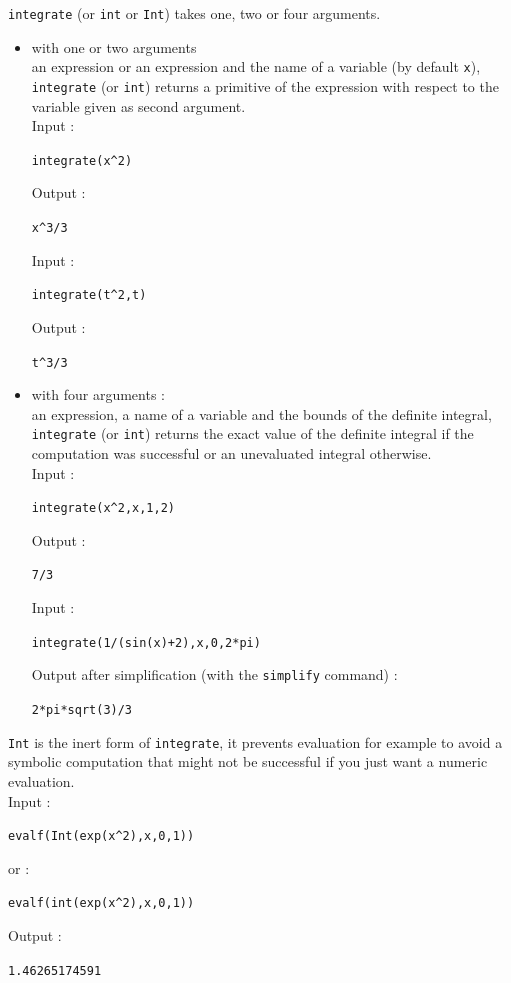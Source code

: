 \documentclass[a4paper,11pt]{book}
\begin{document}
{\tt integrate} (or {\tt int} or {\tt Int}) takes one, two or four arguments.
\begin{itemize}
\item with one or two arguments\\
an expression or an expression and 
the name of a variable (by default {\tt x}),\\
{\tt integrate} (or {\tt int}) returns a primitive of the expression with 
respect to the  variable given as second argument.\\
Input :
\begin{center}{\tt integrate(x\verb|^|2)}\end{center}
Output  :
\begin{center}{\tt x\verb|^|3/3}\end{center}
Input :
\begin{center}{\tt integrate(t\verb|^|2,t)}\end{center}
Output  :
\begin{center}{\tt t\verb|^|3/3}\end{center}
\item with four arguments :\\
an expression, a name of a variable and the bounds of the definite integral,\\ 
{\tt integrate} (or {\tt int}) returns the exact
value of the definite integral if the computation was successful or
an unevaluated integral otherwise.\\
Input :
\begin{center}{\tt integrate(x\verb|^|2,x,1,2)}\end{center}
Output  :
\begin{center}{\tt 7/3}\end{center}
Input :
\begin{center}{\tt integrate(1/(sin(x)+2),x,0,2*pi)}\end{center}
Output  after simplification (with the {\tt simplify} command) :
\begin{center}{\tt 2*pi*sqrt(3)/3}\end{center}
\end{itemize}


{\tt Int} is the inert form of {\tt integrate}, it prevents evaluation
for example to avoid a symbolic computation that might not be
successful if you just want a numeric
evaluation.\\
Input :
\begin{center}{\tt evalf(Int(exp(x\verb|^|2),x,0,1))}\end{center}
or :
\begin{center}{\tt evalf(int(exp(x\verb|^|2),x,0,1))}\end{center}
Output  :
\begin{center}{\tt 1.46265174591}\end{center}
\end{document}

